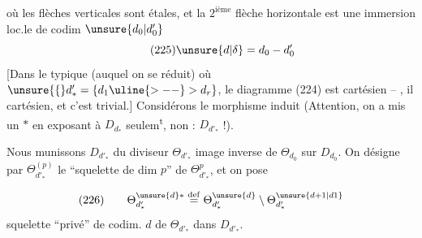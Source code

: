 où les flèches verticales sont étales,
et la $2^{\mathrm{ième}}$ flèche horizontale est une
immersion loc.le de codim $\unsure{d_0|d^{\prime}_0}$
\[
\tag{225}\unsure{d|\delta}=d_0-d'_0
\]
[Dans le typique (auquel on se réduit)
où $\unsure{\{}d'_* = \{d_1\uline{>--} >d_r\}$, le diagramme
(224) est cartésien -- , il
  cartésien,  et c'est trivial.]
Considérons le morphisme induit
(Attention, on a mis un $*$ en exposant
à $D_{d_*}$ seulem\textsuperscript{t}, non : $D_{d'_*}$ !).

Nous munissons $D_{d'_*}$ du diviseur
$\Theta_{d'_*}$ image inverse de $\Theta_{d_0}$ sur $D_{d_0}$.
On désigne par $\Theta_{d'_*}^{(p)}$ le ``squelette
de dim $p$'' de $\Theta_{d'_*}^{p}$, et  on pose


\[
(226)\qquad
\Theta_{d'_*}^{\unsure{d}*}\overset{\mathrm{def}}=
\Theta_{d'_*}^{\unsure{d}}\setminus
\Theta_{d'_*}^{\unsure{d+1|d1}}
\]
squelette ``privé'' de codim. $d$ de
$\Theta_{d'_*}$ dans $D_{d'_*}$.


